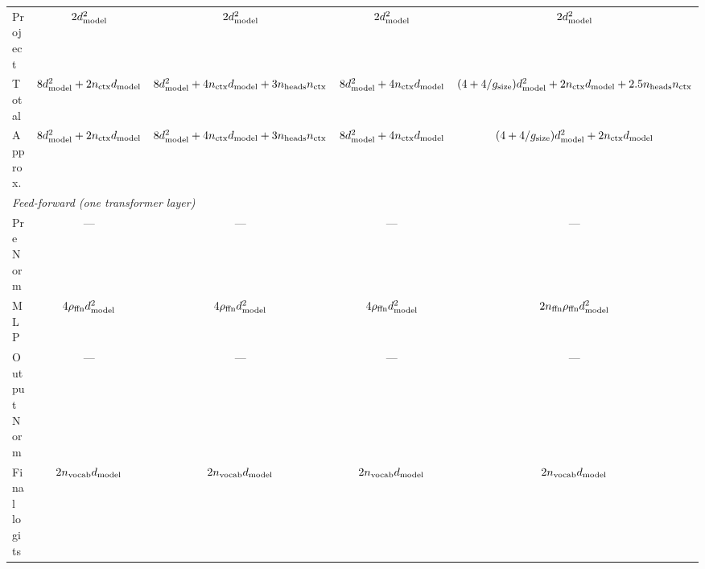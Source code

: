 \begin{table}[h]
{\begin{tabular}{lcccc}
			Project                    & $2 d_\text{model}^2$                                             & $2d_\text{model}^2$                             & $ 2 d_\text{model}^2$                        & $ 2 d_\text{model}^2$             \\
			Total                      & $8d_\text{model}^2+2n_\text{ctx}d_\text{model}$                                & $8d_\text{model}^2+4n_\text{ctx}d_\text{model}+3n_\text{heads}n_\text{ctx}$ &
			$8d_\text{model}^2+4n_\text{ctx}d_\text{model}$ & $(4 + 4/g_{\text{size}})d_\text{model}^2 + 2n_\text{ctx}d_\text{model}+2.5n_\text{heads}n_\text{ctx}$                                                                                                                 \\
			Approx.                    & $8d_\text{model}^2+2n_\text{ctx}d_\text{model}$                                & $8d_\text{model}^2+4n_\text{ctx}d_\text{model}+3n_\text{heads}n_\text{ctx}$ &
			$8d_\text{model}^2+4n_\text{ctx}d_\text{model}$ & $(4 + 4/g_{\text{size}})d_\text{model}^2 + 2n_\text{ctx}d_\text{model}$
			\\
			\midrule
			\multicolumn{5}{l}{\emph{Feed-forward (one transformer layer)}}                                                                                                                                        \\ \midrule
			PreNorm                    & ---                                                       & ---                                      & ---                                   & ---                        \\
			MLP                        & $4 \rho_{\text{ffn}}d_\text{model}^2$                                        & $4 \rho_{\text{ffn}}d_\text{model}^2$                       & $4 \rho_{\text{ffn}}d_\text{model}^2$                    & $2n_\text{ffn} \rho_{\text{ffn}}d_\text{model}^2$    \\ \midrule
			OutputNorm                 & ---                                                       & ---                                      & ---                                   & ---                        \\
			Final logits               & $2 n_\text{vocab} d_\text{model}$                                       & $2 n_\text{vocab} d_\text{model}$                      & $2 n_\text{vocab} d_\text{model}$                   & $2 n_\text{vocab} d_\text{model}$        \\
			\bottomrule
		\end{tabular}
	}
\end{table}

